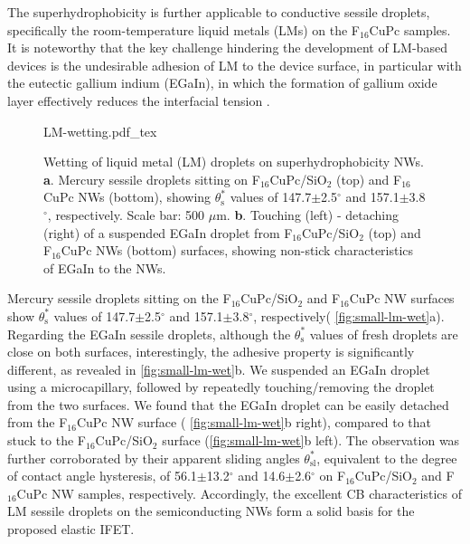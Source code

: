 The superhydrophobicity is further applicable to conductive sessile droplets,
specifically the room-temperature liquid metals\cite{Dickey_2008_EGAIN} (LMs) on the
F\(_{\text{16}}\)CuPc samples.
%
It is noteworthy that the key challenge hindering
the development of LM-based devices is the undesirable adhesion of LM
to the device surface, in particular with the eutectic gallium indium
(EGaIn), in which the formation of gallium oxide layer effectively
reduces the interfacial tension
\cite{Dickey_2008_EGAIN,Doudrick_2014_oxide}.
%
\begin{figure}[htbp]
  \centering
  {LM-wetting.pdf_tex}
  \caption{\label{fig:small-lm-wet} Wetting of liquid
    metal (LM) droplets on superhydrophobicity NWs.
    \textbf{a}. Mercury sessile droplets sitting on
    F\(_{\text{16}}\)CuPc/SiO\(_{\text{2}}\) (top) and
    F\(_{\text{16}}\)CuPc NWs (bottom), showing
    \(\theta_{\mathrm{s}}^{*}\) values of 147.7\(\pm\)2.5\(^{\circ}\)
    and 157.1\(\pm\)3.8\(^{\circ}\), respectively. Scale bar: 500
    \(\mu\)m. \textbf{b}. Touching (left) - detaching (right) of a
    suspended EGaIn droplet from
    F\(_{\text{16}}\)CuPc/SiO\(_{\text{2}}\) (top) and
    F\(_{\text{16}}\)CuPc NWs (bottom) surfaces, showing non-stick
    characteristics of EGaIn to the NWs.}
\end{figure}
Mercury sessile droplets sitting on the
F\(_{\text{16}}\)CuPc/SiO\(_{\text{2}}\) and F\(_{\text{16}}\)CuPc NW
surfaces show \(\theta_{\mathrm{s}}^{*}\) values of
147.7\(\pm\)2.5\(^{\circ}\) and 157.1\(\pm\)3.8\(^{\circ}\),
respectively( \autoref{fig:small-lm-wet}a).  Regarding the EGaIn
sessile droplets, although the \(\theta_{\mathrm{s}}^{*}\) values of
fresh droplets are close on both surfaces, interestingly, the adhesive
property is significantly different, as revealed in
\autoref{fig:small-lm-wet}b. We suspended an EGaIn droplet using a
microcapillary, followed by repeatedly touching/removing the droplet
from the two surfaces. We found that the EGaIn droplet can be easily
detached from the F\(_{\text{16}}\)CuPc NW surface (
\autoref{fig:small-lm-wet}b right), compared to that stuck to the
F\(_{\text{16}}\)CuPc/SiO\(_{\text{2}}\) surface
(\autoref{fig:small-lm-wet}b left). The observation was further
corroborated by their apparent sliding angles
\(\theta_{\mathrm{sl}}^{*}\), equivalent to the degree of contact
angle hysteresis, of 56.1\(\pm\)13.2\(^{\circ}\) and
14.6\(\pm\)2.6\(^{\circ}\) on F\(_{\text{16}}\)CuPc/SiO\(_{\text{2}}\)
and F\(_{\text{16}}\)CuPc NW samples, respectively. Accordingly, the
excellent CB characteristics of LM sessile droplets on the
semiconducting NWs form a solid basis for the proposed elastic IFET.


